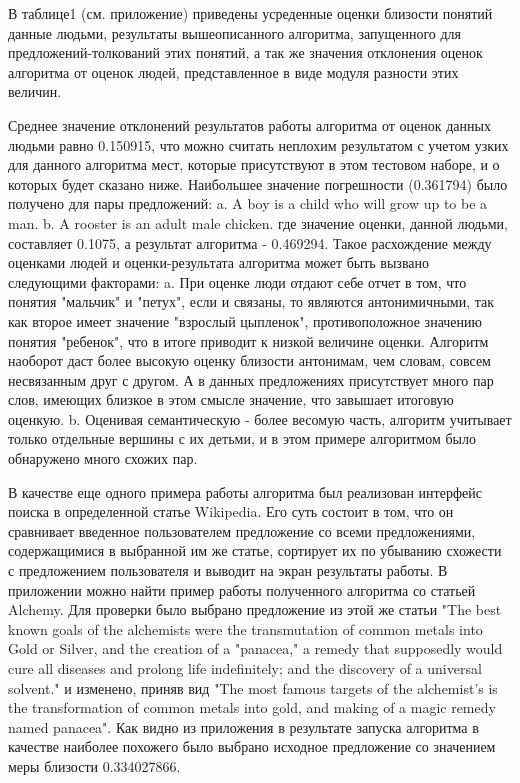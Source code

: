 В таблице1 (см. приложение) приведены усреденные оценки близости понятий данные людьми,
результаты вышеописанного алгоритма, запущенного для предложений-толкований этих понятий, 
а так же значения отклонения оценок алгоритма от оценок людей, 
представленное в виде модуля разности этих величин.

Среднее значение отклонений результатов работы алгоритма от оценок данных людьми равно 0.150915,
что можно считать неплохим результатом с учетом узких для данного алгоритма мест,
которые присутствуют в этом тестовом наборе, и о которых будет сказано ниже. 
Наибольшее значение погрешности (0.361794) было получено для пары предложений:
	a. A boy is a child who will grow up to be a man.
	b. A rooster is an adult male chicken.
где значение оценки, данной людьми, составляет 0.1075, а результат алгоритма - 0.469294.
Такое расхождение между оценками людей и оценки-результата алгоритма может быть вызвано
следующими факторами:
a. При оценке люди отдают себе отчет в том, что понятия "мальчик" и "петух", если и связаны,
то являются антонимичными, так как второе имеет значение "взрослый цыпленок", противоположное
значению понятия "ребенок", что в итоге приводит к низкой величине оценки. 
Алгоритм наоборот даст более высокую оценку близости антонимам, чем словам,
совсем несвязанным друг с другом. А в данных предложениях присутствует
много пар слов, имеющих близкое в этом смысле значение, что завышает итоговую оценкую.
b. Оценивая семантическую - более весомую часть, алгоритм учитывает только отдельные вершины
с их детьми, и в этом примере алгоритмом было обнаружено много схожих пар.

В качестве еще одного примера работы алгоритма был реализован
интерфейс поиска в определенной статье Wikipedia.
Его суть состоит в том, что он сравнивает введенное пользователем предложение
со всеми предложениями, содержащимися в выбранной им же статье, сортирует их по убыванию
схожести с предложением пользователя и выводит на экран результаты работы.
В приложении можно найти пример работы полученного алгоритма со статьей Alchemy.
Для проверки было выбрано предложение из этой же статьи
"The best known goals of the alchemists were the transmutation of common metals into Gold or Silver, and the creation of a "panacea," a remedy that supposedly would cure all diseases and prolong life indefinitely; and the discovery of a universal solvent."
и изменено, приняв вид
"The most famous targets of the alchemist's is the transformation of common metals into gold, and making of a magic remedy named panacea".
Как видно из приложения в результате запуска алгоритма в качестве наиболее похожего 
было выбрано исходное предложение со значением меры близости 0.334027866.

